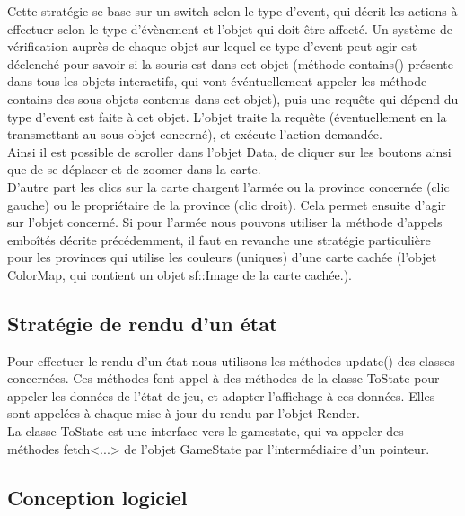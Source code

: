\documentclass[a4paper,12pt]{article}
\begin{document}
Cette stratégie se base sur un switch selon le type d'event, qui décrit les actions à effectuer selon le type d'évènement et l'objet qui doit être affecté. Un système de vérification auprès de chaque objet sur lequel ce type d'event peut agir est déclenché pour savoir si la souris est dans cet objet (méthode contains() présente dans tous les objets interactifs, qui vont événtuellement appeler les méthode contains des sous-objets contenus dans cet objet), puis une requête qui dépend du type d'event est faite à cet objet. L'objet traite la requête (éventuellement en la transmettant au sous-objet concerné), et exécute l'action demandée.\\

Ainsi il est possible de scroller dans l'objet Data, de cliquer sur les boutons ainsi que de se déplacer et de zoomer dans la carte.\\

D'autre part les clics sur la carte chargent l'armée ou la province concernée (clic gauche) ou le propriétaire de la province (clic droit). Cela permet ensuite d'agir sur l'objet concerné. Si pour l'armée nous pouvons utiliser la méthode d'appels emboîtés décrite précédemment, il faut en revanche une stratégie particulière pour les provinces qui utilise les couleurs (uniques) d'une carte cachée (l'objet ColorMap, qui contient un objet sf::Image de la carte cachée.).\\

\subsection{Stratégie de rendu d'un état}
Pour effectuer le rendu d'un état nous utilisons les méthodes update() des classes concernées. Ces méthodes font appel à des méthodes de la classe ToState pour appeler les données de l'état de jeu, et adapter l'affichage à ces données. Elles sont appelées à chaque mise à jour du rendu par l'objet Render.\\

La classe ToState est une interface vers le gamestate, qui va appeler des méthodes fetch<...> de l'objet GameState par l'intermédiaire d'un pointeur.\\   

\subsection{Conception logiciel}
\end{document}
